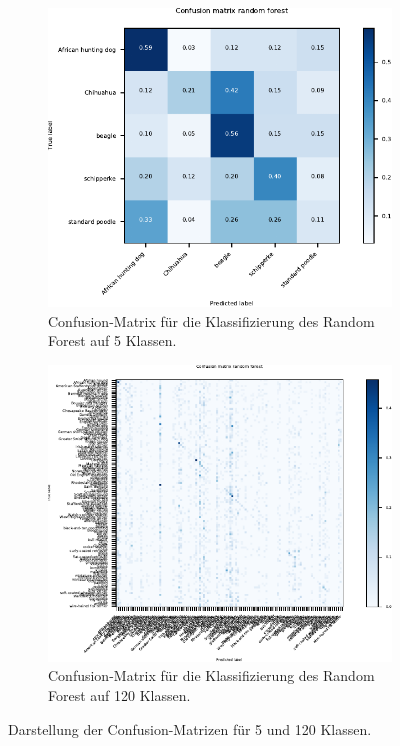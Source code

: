 \begin{figure}
  \begin{subfigure}{0.49\textwidth}
    \centering
    \includegraphics[width=\textwidth]{pics/ergebnisse/RF/confusion_matrix_rf.pdf}
    \caption{Confusion-Matrix für die Klassifizierung des Random Forest auf 5 Klassen.}
    \label{sub:confusion-rf-5}
  \end{subfigure}
  \qquad
  \begin{subfigure}{0.49\textwidth}
    \centering
    \includegraphics[width=\textwidth]{pics/ergebnisse/RF/confusion_matrix_big.pdf}
    \caption{Confusion-Matrix für die Klassifizierung des Random Forest auf 120 Klassen.}
    \label{sub:confusion-rf-120}
  \end{subfigure}
  \caption{Darstellung der Confusion-Matrizen für 5 und 120 Klassen.}
  \label{fig:confusion-rf}
\end{figure}
